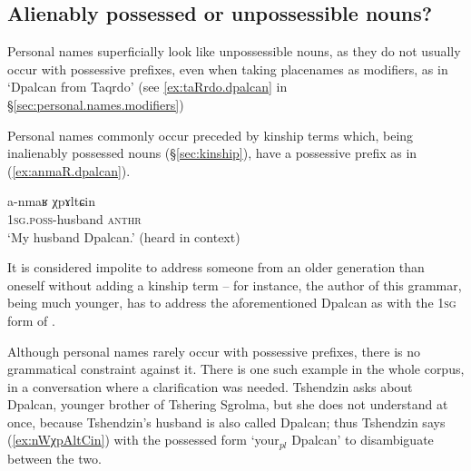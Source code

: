 
 

\subsection{Alienably possessed or unpossessible nouns?} \label{sec:personal.name.APN}
Personal names superficially look like unpossessible nouns, as they do not usually occur with possessive prefixes, even when taking placenames as modifiers, as in  `Dpalcan from Taqrdo' (see \ref{ex:taRrdo.dpalcan} in §\ref{sec:personal.names.modifiers})

Personal names commonly occur preceded by kinship terms which, being inalienably possessed nouns (§\ref{sec:kinship}), have a possessive prefix as in (\ref{ex:anmaR.dpalcan}). 

\begin{exe}
\ex \label{ex:anmaR.dpalcan}
\gll a-nmaʁ χpɤltɕin \\
\textsc{1sg}.\textsc{poss}-husband \textsc{anthr} \\
\glt `My husband Dpalcan.' (heard in context)
\end{exe}

It is considered impolite to address someone from an older generation than oneself without adding a kinship term -- for instance, the author of this grammar, being much younger, has to address the aforementioned Dpalcan as  with the \textsc{1sg} form of .

Although personal names rarely occur with possessive prefixes, there is no grammatical constraint against it. There is one such example in the whole corpus, in a conversation where a clarification was needed. Tshendzin asks about Dpalcan, younger brother of Tshering Sgrolma, but she does not understand at once, because Tshendzin's husband is also called Dpalcan; thus Tshendzin says (\ref{ex:nWχpAltCin}) with the possessed form  `your$_{pl}$ Dpalcan' to disambiguate between the two. 

